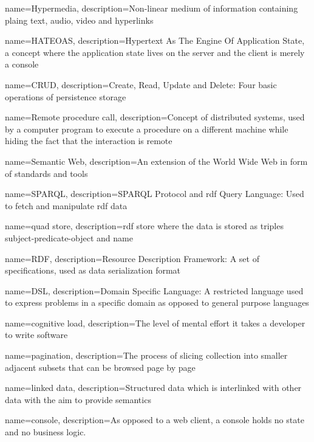 {
    name={Hypermedia},
    description={Non-linear medium of information containing plaing text, audio, video and hyperlinks}
}

{
    name={HATEOAS},
    description={Hypertext As The Engine Of Application State, a concept where the application state lives on the server and the client is merely a \gls{console}}
}

{
    name={CRUD},
    description={Create, Read, Update and Delete: Four basic operations of persistence storage}
}

{
    name={Remote procedure call},
    description={Concept of distributed systems, used by a computer program to execute a procedure on a different machine while hiding the fact that the interaction is remote}
}

{
    name={Semantic Web},
    description={An extension of the World Wide Web in form of standards and tools}
}

{
    name={SPARQL},
    description={SPARQL Protocol and \gls{rdf} Query Language: Used to fetch and manipulate \gls{rdf} data}
}

{
    name={quad store},
    description={\gls{rdf} store where the data is stored as triples subject-predicate-object and name}
}

{
    name={RDF},
    description={Resource Description Framework: A set of specifications, used as data serialization format}
}

{
    name={DSL},
    description={Domain Specific Language: A restricted language used to express problems in a specific domain as opposed to general purpose languages}
}

{
    name={cognitive load},
    description={The level of mental effort it takes a developer to write software}
}

{
    name={pagination},
    description={The process of slicing collection into smaller adjacent subsets that can be browsed page by page}
}

{
    name={linked data},
    description={Structured data which is interlinked with other data with the aim to provide semantics}
}

{
    name={console},
    description={As opposed to a web client, a console holds no state and no business logic.}
}

